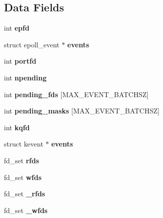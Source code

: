 \subsection*{Data Fields}
\begin{DoxyCompactItemize}
\item 
\mbox{\label{structaeApiState_ad22cb6aa093b0606521178bee5fc9e57}} 
int {\bfseries epfd}
\item 
\mbox{\label{structaeApiState_aae9919a5fbc7f635b7add5e9afca911f}} 
struct epoll\+\_\+event $\ast$ {\bfseries events}
\item 
\mbox{\label{structaeApiState_a03b5c6f2f76f6817b516078a80132322}} 
int {\bfseries portfd}
\item 
\mbox{\label{structaeApiState_a4adaf2e0c58326bb1fb58f9dff2010f6}} 
int {\bfseries npending}
\item 
\mbox{\label{structaeApiState_afd83ec51c15792c39367389a247b43b5}} 
int {\bfseries pending\+\_\+fds} \mbox{[}M\+A\+X\+\_\+\+E\+V\+E\+N\+T\+\_\+\+B\+A\+T\+C\+H\+SZ\mbox{]}
\item 
\mbox{\label{structaeApiState_a6ee1e116dccf9bf2a1bd466226ff6dfa}} 
int {\bfseries pending\+\_\+masks} \mbox{[}M\+A\+X\+\_\+\+E\+V\+E\+N\+T\+\_\+\+B\+A\+T\+C\+H\+SZ\mbox{]}
\item 
\mbox{\label{structaeApiState_a091974c7b256e357ff535ce63012ff84}} 
int {\bfseries kqfd}
\item 
\mbox{\label{structaeApiState_a3dad05e80c97db4396002b7e77e02c9c}} 
struct kevent $\ast$ {\bfseries events}
\item 
\mbox{\label{structaeApiState_a3faa88b3bb101d3f8879a4c167a553d8}} 
fd\+\_\+set {\bfseries rfds}
\item 
\mbox{\label{structaeApiState_a5e0a54365408102a313690971e9e6d95}} 
fd\+\_\+set {\bfseries wfds}
\item 
\mbox{\label{structaeApiState_ab9820d1695885949ecf0d2ce687a8568}} 
fd\+\_\+set {\bfseries \+\_\+rfds}
\item 
\mbox{\label{structaeApiState_a112ee06858937f805534a328e3620327}} 
fd\+\_\+set {\bfseries \+\_\+wfds}
\end{DoxyCompactItemize}


